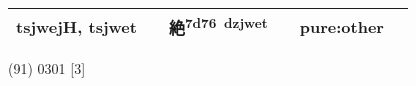 \documentclass[14pt,a4paper]{scrartcl}
\begin{document}
\begin{longtable}[c]{@{}llllll@{}}
\begin{minipage}[t]{0.14\columnwidth}
tsjwejH, tsjwet
\strut\end{minipage} &
\begin{minipage}[t]{0.14\columnwidth}\raggedright\strut
\strut\end{minipage} &
\begin{minipage}[t]{0.14\columnwidth}\raggedright\strut
絶\textsuperscript{7d76~dzjwet}
\strut\end{minipage} &
\begin{minipage}[t]{0.14\columnwidth}\raggedright\strut
\strut\end{minipage} &
\begin{minipage}[t]{0.14\columnwidth}\raggedright\strut
pure:other
\strut\end{minipage}\tabularnewline
\bottomrule
\end{longtable}

(91) 0301 {[}3{]}
\end{document}
